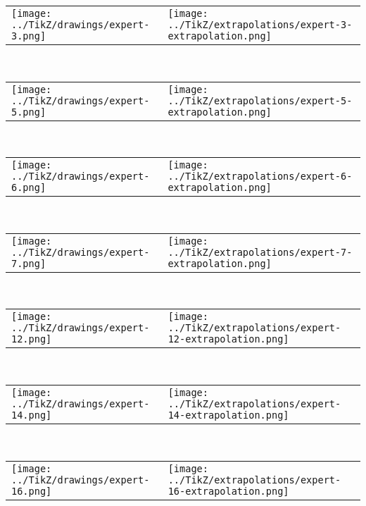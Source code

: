 
            \begin{tabular}{ll}
    \texttt{[image: ../TikZ/drawings/expert-3.png]}&
    \texttt{[image: ../TikZ/extrapolations/expert-3-extrapolation.png]}
    \end{tabular}        
            \\

            \begin{tabular}{ll}
    \texttt{[image: ../TikZ/drawings/expert-5.png]}&
    \texttt{[image: ../TikZ/extrapolations/expert-5-extrapolation.png]}
    \end{tabular}        
            \\

            \begin{tabular}{ll}
    \texttt{[image: ../TikZ/drawings/expert-6.png]}&
    \texttt{[image: ../TikZ/extrapolations/expert-6-extrapolation.png]}
    \end{tabular}        
            \\

            \begin{tabular}{ll}
    \texttt{[image: ../TikZ/drawings/expert-7.png]}&
    \texttt{[image: ../TikZ/extrapolations/expert-7-extrapolation.png]}
    \end{tabular}        
            \\

            \begin{tabular}{ll}
    \texttt{[image: ../TikZ/drawings/expert-12.png]}&
    \texttt{[image: ../TikZ/extrapolations/expert-12-extrapolation.png]}
    \end{tabular}        
            \\

            \begin{tabular}{ll}
    \texttt{[image: ../TikZ/drawings/expert-14.png]}&
    \texttt{[image: ../TikZ/extrapolations/expert-14-extrapolation.png]}
    \end{tabular}        
            \\

            \begin{tabular}{ll}
    \texttt{[image: ../TikZ/drawings/expert-16.png]}&
    \texttt{[image: ../TikZ/extrapolations/expert-16-extrapolation.png]}
    \end{tabular}        
            \\

